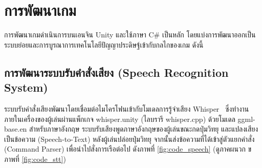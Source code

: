 
\section{การพัฒนาเกม}

การพัฒนาเกมดำเนินการบนเอนจิน Unity และใช้ภาษา C\# เป็นหลัก โดยแบ่งการพัฒนาออกเป็นระบบย่อยและการบูรณาการเทคโนโลยีปัญญาประดิษฐ์เข้ากับกลไกของเกม ดังนี้

\subsection{การพัฒนาระบบรับคำสั่งเสียง (Speech Recognition System)}
ระบบรับคำสั่งเสียงพัฒนาโดยเชื่อมต่อไมโครโฟนเข้ากับโมเดลการรู้จำเสียง Whisper~\cite{radford2023} ซึ่งทำงานภายในเครื่องของผู้เล่นผ่านแพ็กเกจ whisper.unity (ไลบรารี whisper.cpp) ด้วยโมเดล ggml-base.en สำหรับภาษาอังกฤษ ระบบรับเสียงพูดภาษาอังกฤษของผู้เล่นขณะกดปุ่มวิทยุ และแปลงเสียงเป็นข้อความ (Speech-to-Text) หลังผู้เล่นปล่อยปุ่มวิทยุ จากนั้นส่งข้อความที่ได้เข้าสู่ตัวแยกคำสั่ง (Command Parser) เพื่อนำไปสั่งการเรือต่อไป ดังภาพที่ \ref{fig:code_speech} (ดูภาคผนวก ข ภาพที่ \ref{fig:code_stt})

